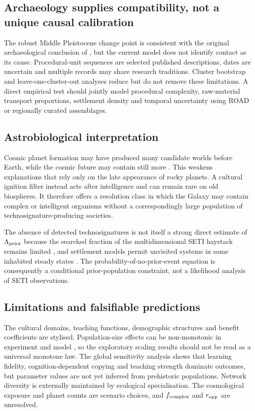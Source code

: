\documentclass{article_saj}
\begin{document}
\subsection{Archaeology supplies compatibility, not a unique causal calibration}

The robust Middle Pleistocene change point is consistent with the original archaeological conclusion of \citet{paige2024}, but the current model does not identify contact as its cause. Procedural-unit sequences are selected published descriptions, dates are uncertain and multiple records may share research traditions. Cluster bootstrap and leave-one-cluster-out analyses reduce but do not remove these limitations. A direct empirical test should jointly model procedural complexity, raw-material transport proportions, settlement density and temporal uncertainty using ROAD or regionally curated assemblages.

\subsection{Astrobiological interpretation}

Cosmic planet formation may have produced many candidate worlds before Earth, while the cosmic future may contain still more \citep{behroozi2015,loeb2016}. This weakens explanations that rely only on the late appearance of rocky planets. A cultural ignition filter instead acts after intelligence and can remain rare on old biospheres. It therefore offers a resolution class in which the Galaxy may contain complex or intelligent organisms without a correspondingly large population of technosignature-producing societies.

The absence of detected technosignatures is not itself a strong direct estimate of \(\Lambda_{\rm prior}\) because the searched fraction of the multidimensional SETI haystack remains limited \citep{wright2018}, and settlement models permit unvisited systems in some inhabited steady states \citep{carroll2019}. The probability-of-no-prior-event equation is consequently a conditional prior-population constraint, not a likelihood analysis of SETI observations.

\subsection{Limitations and falsifiable predictions}

The cultural domains, teaching functions, demographic structures and benefit coefficients are stylised. Population-size effects can be non-monotonic in experiment and model \citep{fay2019,walker2026}, so the exploratory scaling results should not be read as a universal monotone law. The global sensitivity analysis shows that learning fidelity, cognition-dependent copying and teaching strength dominate outcomes, but parameter values are not yet inferred from prehistoric populations. Network diversity is externally maintained by ecological specialisation. The cosmological exposure and planet counts are scenario choices, and \(f_{\rm complex}\) and \(r_{\rm opp}\) are unresolved.
\end{document}
